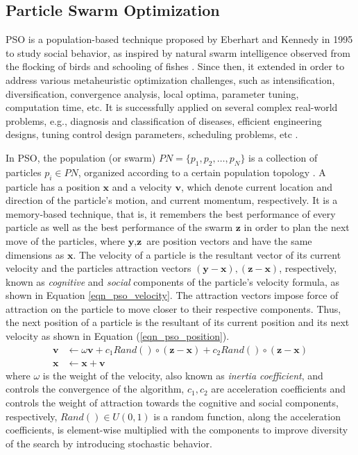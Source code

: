 \subsection{Particle Swarm Optimization}
PSO is a population-based technique proposed by Eberhart and Kennedy in 1995 to study social behavior, as inspired by natural swarm intelligence observed from the flocking of birds and schooling of fishes \cite{Kennedy1995ParticleOptimization}. Since then, it extended in order to address various metaheuristic optimization challenges, such as intensification, diversification, convergence analysis, local optima, parameter tuning, computation time, etc. It is successfully applied on several complex real-world problems, e.g., diagnosis and classification of diseases, efficient engineering designs, tuning control design parameters, scheduling problems, etc \cite{Poli2008AnApplications}. 

In PSO, the population (or swarm) $PN=\{p_1,p_2,…,p_N\}$ is a collection of particles $p_i\in PN$, organized according to a certain population topology \cite{Liu2016TopologyOptimization}. A particle has a position $\textbf{x}$ and a velocity $\textbf{v}$, which denote current location and direction of the particle's motion, and current momentum, respectively. It is a memory-based technique, that is, it remembers the best performance of every particle as well as the best performance of the swarm $\textbf{z}$ in order to plan the next move of the particles, where $\textbf{y},\textbf{z}$ are position vectors and have the same dimensions as $\textbf{x}$. The velocity of a particle is the resultant vector of its current velocity and the particles attraction vectors $(\textbf{y}-\textbf{x}), (\textbf{z}-\textbf{x})$, respectively, known as \textit{cognitive} and \textit{social} components of the  particle's velocity formula, as shown in Equation \ref{eqn_pso_velocity}. The attraction vectors impose force of attraction on the particle to move closer to their respective components. Thus, the next position of a particle is the resultant of its current position and its next velocity as shown in Equation (\ref{eqn_pso_position}).
\begin{align}
    \label{eqn_pso_velocity}
    \textbf{v} &\leftarrow  \omega\textbf{v} + c_1Rand()\circ(\textbf{z}-\textbf{x}) + c_2Rand()\circ(\textbf{z}-\textbf{x})\\
    \label{eqn_pso_position}
    \textbf{x} &\leftarrow \textbf{x} + \textbf{v}
\end{align}
where $\omega$ is the weight of the velocity, also known as \textit{inertia coefficient}, and controls the convergence of the algorithm, $c_1, c_2$ are acceleration coefficients and controls the weight of attraction towards the cognitive and social components, respectively, $Rand()\in U(0,1)$ is a random function, along the acceleration coefficients, is element-wise multiplied with the components to improve diversity of the search by introducing stochastic behavior.

